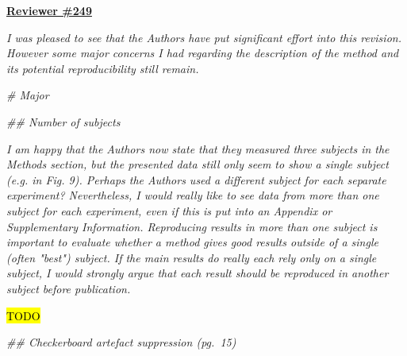 \documentclass[a4paper,11pt,twoside]{report}
\begin{document}
\clearpage
\noindent \underline{\textbf{Reviewer \#249}}

\textit{I was pleased to see that
the Authors have put significant effort into this revision.
However some major concerns I had
regarding the description of the method and
its potential reproducibility still remain.}

\vspace{1em}

\noindent \textit{\# Major}

\vspace{1em}

\noindent \textit{\#\# Number of subjects}

\textit{I am happy that the Authors now state that they measured three subjects in the Methods section, but the presented data still only seem to show a single subject (e.g. in Fig. 9). Perhaps the Authors used a different subject for each separate experiment? Nevertheless, I would really like to see data from more than one subject for each experiment, even if this is put into an Appendix or Supplementary Information. Reproducing results in more than one subject is important to evaluate whether a method gives good results outside of a single (often "best") subject. If the main results do really each rely only on a single subject, I would strongly argue that each result should be reproduced in another subject before publication.}

\hspace{1em} {\color{blue} \hl{TODO}}


\noindent \textit{\#\# Checkerboard artefact suppression (pg.~15)}
\end{document}
